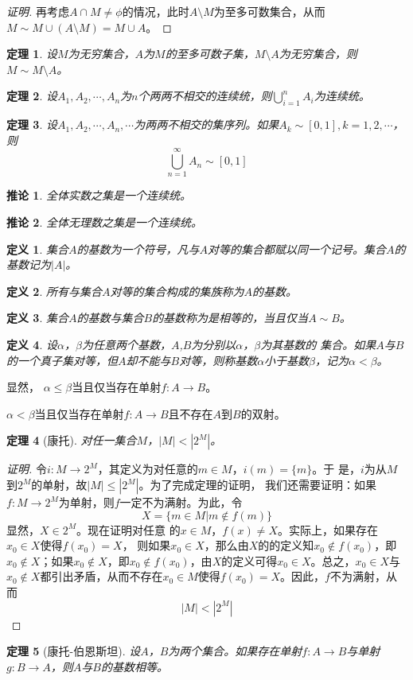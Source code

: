 \documentclass{book}[oneside]
\newtheorem{Def}{定义}[chapter]
\newtheorem{Thm}{定理}[chapter]
\newtheorem{Cor}{推论}[chapter]
\begin{document}
\begin{CJK*}{UTF8}{gbsn}
\begin{proof}[证明]
    再考虑$A\cap M\neq \phi$的情况，此时$A\setminus M$为至多可数集合，从而$M\sim M\cup(A\setminus M)=M\cup A$。
  \end{proof}
  \begin{Thm}
    设$M$为无穷集合，$A$为$M$的至多可数子集，$M\setminus A$为无穷集合，则$M \sim M\setminus A$。
  \end{Thm}
  \begin{Thm}
    设$A_1, A_2, \cdots, A_n$为$n$个两两不相交的连续统，则$\bigcup_{i=1}^nA_i$为连续统。
  \end{Thm}
  \begin{Thm}
    设$A_1, A_2, \cdots, A_n, \cdots$为两两不相交的集序列。如果$A_k \sim [0,1], k = 1, 2, \cdots$，则
    \[\bigcup_{n=1}^{\infty}A_n \sim [0,1]\]
  \end{Thm}
 \begin{Cor}
   全体实数之集是一个连续统。
 \end{Cor}
 \begin{Cor}
   全体无理数之集是一个连续统。
 \end{Cor}
  \begin{Def}
    集合$A$的基数为一个符号，凡与$A$对等的集合都赋以同一个记号。集合$A$的基数记为$|A|$。
  \end{Def}
  \begin{Def}
    所有与集合$A$对等的集合构成的集族称为$A$的基数。
  \end{Def}
    \begin{Def}
    集合$A$的基数与集合$B$的基数称为是相等的，当且仅当$A \sim B$。
  \end{Def}
  \begin{Def}
    设$\alpha$，$\beta$为任意两个基数，$A$,$B$为分别以$\alpha$，$\beta$为其基数的
    集合。如果$A$与$B$的一个真子集对等，但$A$却不能与$B$对等，则称基数$\alpha$小于基数$\beta$，记为$\alpha < \beta$。
  \end{Def}
  显然，
  $\alpha \leq \beta$当且仅当存在单射$f:A \to B$。

  $\alpha < \beta$当且仅当存在单射$f:A \to B$且不存在$A$到$B$的双射。

  \begin{Thm}[康托]
    对任一集合$M$，$|M| < |2^{M}|$。
  \end{Thm}
  \begin{proof}[证明]
    令$i:M\to
    2^M$，其定义为对任意的$m\in M$，$i(m)=\{m\}$。于
    是，$i$为从$M$到$2^M$的单射，故$|M|\leq |2^M|$。为了完成定理的证明，
    我们还需要证明：如果$f:M\to 2^M$为单射，则$f$一定不为满射。为此，令
    \[X=\{m\in M|m \notin f(m)\}\]显然，$X\in 2^M$。现在证明对任意
    的$x\in M$，$f(x)\neq X$。实际上，如果存在$x_0\in X$使得$f(x_0)=X$，
    则如果$x_0\in X$，那么由$X$的的定义知$x_0\notin
    f(x_0)$，即$x_0\notin X$；如果$x_0\notin X$，即$x_0\notin f(x_0)$，由$X$的定义可得$x_0\in X$。总之，$x_0\in X$与$x_0\notin X$都引出矛盾，从而不存在$x_0\in M$使得$f(x_0)=X$。因此，$f$不为满射，从而
    \[|M|<|2^M|\]
  \end{proof}
  \begin{Thm}[康托-伯恩斯坦]
    设$A$，$B$为两个集合。如果存在单射$f:A\to B$与单射$g:B\to A$，则$A$与$B$的基数相等。
  \end{Thm}


\end{CJK*}
\end{document}
